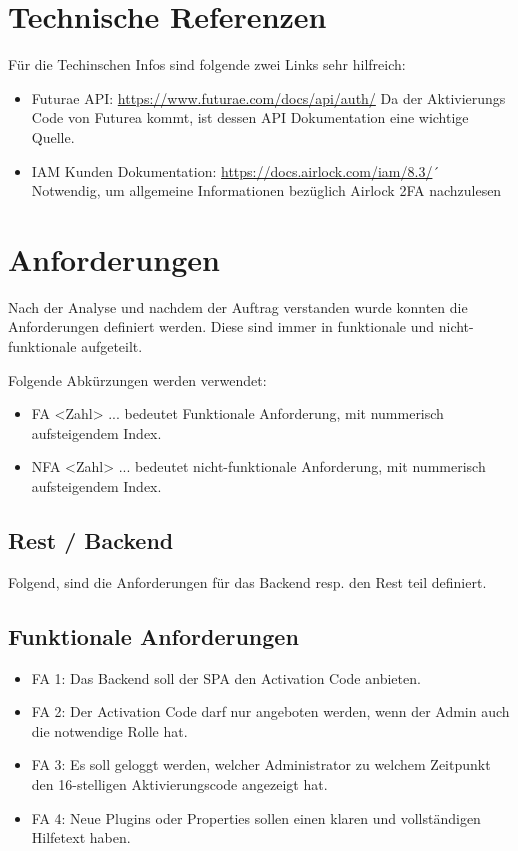 \section{Technische Referenzen}
Für die Techinschen Infos sind folgende zwei Links sehr hilfreich:
\begin{itemize}
	\item Futurae API: \url{https://www.futurae.com/docs/api/auth/}\newline
	 Da der Aktivierungs Code von Futurea kommt, ist dessen API Dokumentation eine wichtige Quelle.
	\item IAM Kunden Dokumentation: \url{https://docs.airlock.com/iam/8.3/}´
	Notwendig, um allgemeine Informationen bezüglich Airlock 2FA nachzulesen
\end{itemize}

\section{Anforderungen}
Nach der Analyse und nachdem der Auftrag verstanden wurde konnten die Anforderungen definiert werden. Diese sind immer in funktionale und nicht-funktionale aufgeteilt.

Folgende Abkürzungen werden verwendet:
\begin{itemize}
	\item FA <Zahl> ... bedeutet Funktionale Anforderung, mit nummerisch aufsteigendem Index.
	\item NFA <Zahl> ... bedeutet nicht-funktionale Anforderung, mit nummerisch aufsteigendem Index.
\end{itemize}

\subsection{Rest / Backend} \label{subsec:anforderungenBackend}

Folgend, sind die Anforderungen für das Backend resp. den Rest teil definiert.

\subsection*{Funktionale Anforderungen}
\begin{itemize}
	\item FA 1: Das Backend soll der SPA den Activation Code anbieten.
	\item FA 2: Der Activation Code darf nur angeboten werden, wenn der Admin auch die notwendige Rolle hat.
	\item FA 3: Es soll geloggt werden, welcher Administrator zu welchem Zeitpunkt den 16-stelligen Aktivierungscode angezeigt hat.
	\item FA 4: Neue Plugins oder Properties sollen einen klaren und vollständigen Hilfetext haben.
\end{itemize}

